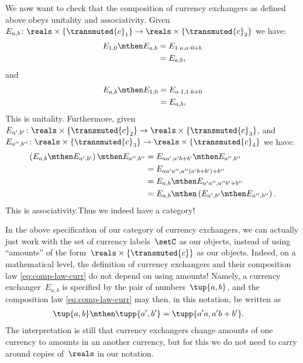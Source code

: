 We now want to check that the composition of currency exchangers as defined above obeys unitality and associativity. Given~$E_{a,b}\colon \reals \times \{\transmuted{c}_1\}\to \reals \times \{\transmuted{c}_2\}$ we have:
\begin{equation*}
    \begin{aligned}
      E_{1,0}\mthen E_{a,b}&=E_{1\cdot a, a\cdot 0+b}\\
      &=E_{a,b},
    \end{aligned}
\end{equation*}
and
\begin{equation*}
    \begin{aligned}
      E_{a,b}\mthen E_{1,0}&=E_{a\cdot 1, 1\cdot b+0}\\
      &=E_{a,b},
    \end{aligned}
\end{equation*}
This is unitality. Furthermore, given~$E_{a',b'}\colon \reals \times \{\transmuted{c}_2\}\to \reals\times \{\transmuted{c}_3\}$, and~$E_{a'',b''}\colon \reals \times \{\transmuted{c}_3\}\to \reals \times \{\transmuted{c}_4\}$ we have:
\begin{equation*}
    \begin{aligned}
     \left( E_{a,b}\mthen E_{a',b'}\right)\mthen E_{a'',b''}&=E_{aa',a'b+b'}\mthen E_{a'',b''}\\
     &=E_{aa'a'',a''(a'b+b')+b''}\\
     &=E_{a,b}\mthen E_{a'a'',a''b'+b''}\\
     &=E_{a,b}\mthen \left( E_{a',b'}\mthen E_{a'',b''}\right).
    \end{aligned}
\end{equation*}
This is associativity.Thus we indeed have a category!

\begin{remark}
  In the above specification of our category of currency exchangers, we can actually just work with the set of currency labels~$\setC$ as our objects, instead of using ``amounts'' of the form~$\reals \times \{\transmuted{c}\}$ as our objects.
  Indeed, on a mathematical level, the definition of currency exchangers and their composition law \cref{eq:comp-law-curr} do not depend on using amounts!
  Namely, a currency exchanger~$E_{a,b}$ is specified by the pair of numbers~$\tup{a, b}$, and the composition law \cref{eq:comp-law-curr} may then, in this notation, be written as
  \begin{equation}
    \begin{aligned}
      \label{eq:currencycomp}
      \tup{a,b}\mthen \tupp{a',b'}&=\tupp{a' a, a' b + b'}.
    \end{aligned}
  \end{equation}
  The interpretation is still that currency exchangers change amounts of one currency to amounts in an another currency, but for this we do not need to carry around copies of~$\reals$ in our notation.
\end{remark}

